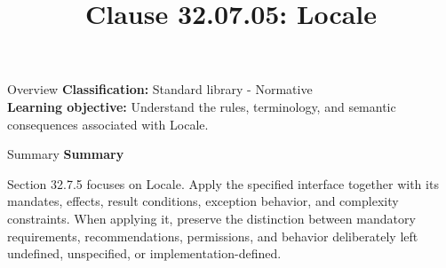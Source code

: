 \documentclass[10pt,letterpaper]{article}
\title{Clause 32.07.05: Locale}
\author{}
\date{}
\begin{document}
\maketitle
\begin{CornellOverviewBox}{Overview}
\textbf{Classification:} Standard library - Normative\\[2pt]
\textbf{Learning objective:} Understand the rules, terminology, and semantic consequences associated with Locale.
\end{CornellOverviewBox}\begin{CornellSummaryBox}{Summary}
{\sffamily\bfseries\color{Accent} Summary}\par\vspace{3pt}Section 32.7.5 focuses on Locale. Apply the specified interface together with its mandates, effects, result conditions, exception behavior, and complexity constraints. When applying it, preserve the distinction between mandatory requirements, recommendations, permissions, and behavior deliberately left undefined, unspecified, or implementation-defined.
\end{CornellSummaryBox}
\end{document}
